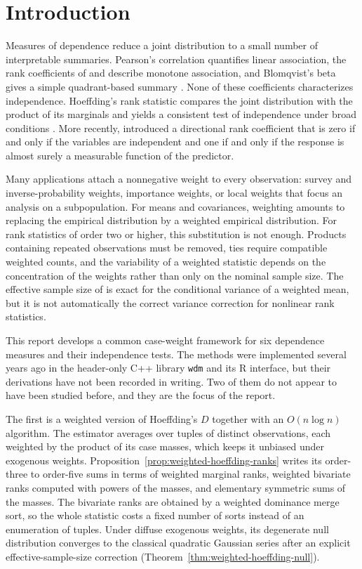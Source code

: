 \section{Introduction}
\label{sec:introduction}

Measures of dependence reduce a joint distribution to a small number of
interpretable summaries. Pearson's correlation quantifies linear association,
the rank coefficients of \citet{spearman1904} and \citet{kendall1938} describe
monotone association, and Blomqvist's beta gives a simple quadrant-based
summary \citep{blomqvist1950}. None of these coefficients characterizes
independence. Hoeffding's rank statistic compares the joint distribution with
the product of its marginals and yields a consistent test of independence
under broad conditions \citep{hoeffding1948}. More recently,
\citet{chatterjee2021} introduced a directional rank coefficient that is zero
if and only if the variables are independent and one if and only if the
response is almost surely a measurable function of the predictor.

Many applications attach a nonnegative weight to every observation: survey and
inverse-probability weights, importance weights, or local weights that focus
an analysis on a subpopulation. For means and covariances, weighting amounts
to replacing the empirical distribution by a weighted empirical distribution.
For rank statistics of order two or higher, this substitution is not enough.
Products containing repeated observations must be removed, ties require
compatible weighted counts, and the variability of a weighted statistic
depends on the concentration of the weights rather than only on the nominal
sample size. The effective sample size of \citet{kish1965} is exact for the
conditional variance of a weighted mean, but it is not automatically the
correct variance correction for nonlinear rank statistics.

This report develops a common case-weight framework for six dependence
measures and their independence tests. The methods were implemented several
years ago in the header-only C++ library \texttt{wdm} and its R interface,
but their derivations have not been recorded in writing. Two of them do not
appear to have been studied before, and they are the focus of the report.

The first is a weighted version of Hoeffding's $D$ together with an
$O(n\log n)$ algorithm. The estimator averages over tuples of distinct
observations, each weighted by the product of its case masses, which keeps
it unbiased under exogenous weights. Proposition~\ref{prop:weighted-hoeffding-ranks}
writes its order-three to order-five sums in terms of weighted marginal ranks,
weighted bivariate ranks computed with powers of the masses, and elementary
symmetric sums of the masses. The bivariate ranks are obtained by a weighted
dominance merge sort, so the whole statistic costs a fixed number of sorts
instead of an enumeration of tuples. Under diffuse exogenous weights, its
degenerate null distribution converges to the classical quadratic Gaussian
series after an explicit effective-sample-size correction
(Theorem~\ref{thm:weighted-hoeffding-null}).

